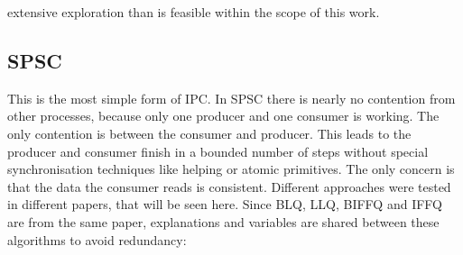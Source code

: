extensive exploration than is feasible within the scope of this work.

\subsection{\acf{SPSC}}\label{subsec:single-producer-and-single-consumer}
This is the most simple form of \ac{IPC}. In \ac{SPSC} there is nearly no contention from other processes, because only one producer and one consumer is working. The only contention is between the consumer and producer. This leads to the producer and consumer finish in a bounded number of steps without special synchronisation techniques like helping or atomic primitives. The only concern is that the data the consumer reads is consistent. Different approaches were tested in different papers, that will be seen here. Since \ac{BLQ}, \ac{LLQ}, \ac{BIFFQ} and \ac{IFFQ} are from the same paper, explanations and variables are shared between these algorithms to avoid redundancy:

